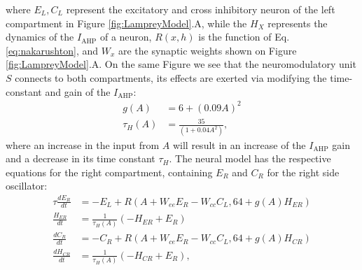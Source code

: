 \documentclass[10pt,a4paper]{article}
\begin{document}
where $E_L, C_L$ represent the excitatory and cross inhibitory neuron of the left compartment in Figure \ref{fig:LampreyModel}.A, while the $H_{X}$ represents the dynamics of the $I_{\text{AHP}}$ of a neuron, $R(x,h)$ is the \cite{naka1966s} function of Eq. \eqref{eq:nakarushton}, and $W_x$ are the synaptic weights shown on Figure  \ref{fig:LampreyModel}.A. On the same Figure we see that the neuromodulatory unit $S$ connects to both compartments, its effects are exerted via modifying the time-constant and gain of the $I_{\text{AHP}}$:
\begin{align}
g(A) &= 6 + \left( 0.09A \right)^2\\
\tau_H(A) &= \frac{35}{(1 + 0.04 A^2)},
\end{align}
where an increase in the input from $A$ will result in an increase of the $I_{\text{AHP}}$ gain and a decrease in its time constant $\tau_H$.
 The neural model has the respective equations for the right compartment, containing  $E_R$ and $C_R$ for the right side oscillator:
\begin{align}
\tau \frac{dE_R}{dt} & = - E_L +  R( A + W_{ee} E_R - W_{cc}C_L, 64 + g(A)H_{ER})\\
\frac{H_{ER}}{dt} &= \frac{1}{\tau_H(A)}(-H_{ER}+E_R)\\
\frac{dC_R}{dt} &= -C_R + R( A + W_{ce}E_R - W_{cc}C_L, 64+g(A)H_{CR})\\
\frac{dH_{CR}}{dt} &= \frac{1}{\tau_H(A)}(-H_{CR}+E_R),
\end{align}
\end{document}
